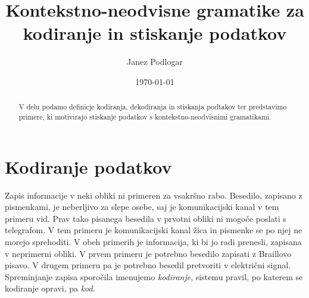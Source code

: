 \documentclass{amsart}
\title{Kontekstno-neodvisne gramatike za kodiranje in stiskanje podatkov}
\author{Janez Podlogar}
\date{\today}
\theoremstyle{definition}
\theoremstyle{plain} %
\begin{document}
\begin{abstract}

    V delu podamo definicje kodiranja, dekodiranja in stiskanja podtakov ter predstavimo
    primere, ki motivirajo stiskanje podatkov s kontekstno-neodvisnimi gramatikami.

\end{abstract}

\maketitle

\section{Kodiranje podatkov}

Zapis informacije v neki obliki ni primeren za vsakršno rabo. Besedilo, zapisano z 
pismenkami, je neberljivo za slepe osebe, saj je komunikacijski kanal v tem primeru
vid. Prav tako pisanega besedila v prvotni obliki ni mogoče poslati s telegrafom. V tem
primeru je komunikacijski kanal žica in pismenke se po njej ne morejo sprehoditi. V obeh 
primerih je informacija, ki bi jo radi prenesli, zapisana v neprimerni obliki. V prvem 
primeru je potrebno besedilo zapisati z Braillovo pisavo. V drugem primeru pa je
potrebno besedil pretvoriti v električni signal. Spreminjanje zapisa sporočila
imenujemo \textit{kodiranje}, sistemu pravil, po katerem se kodiranje opravi,
pa \textit{kod}.
\end{document}
